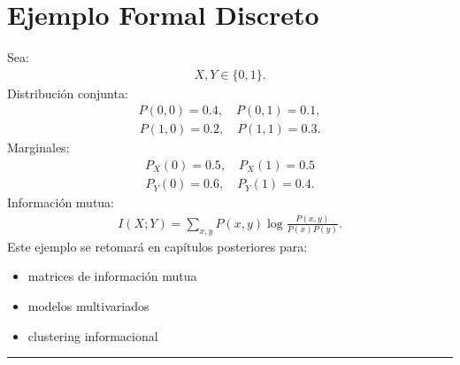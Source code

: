 \documentclass[letterpaper,10pt,english]{jupyterBook}
\begin{document}
\section{Ejemplo Formal Discreto}
\label{\detokenize{02_mathematical_foundations/formal_definitions:ejemplo-formal-discreto}}
\sphinxAtStartPar
Sea:
\begin{equation*}
\begin{split}
X,Y\in\{0,1\}.
\end{split}
\end{equation*}
\sphinxAtStartPar
Distribución conjunta:
\begin{equation*}
\begin{split}
P(0,0)=0.4,\quad
P(0,1)=0.1,
\end{split}
\end{equation*}\begin{equation*}
\begin{split}
P(1,0)=0.2,\quad
P(1,1)=0.3.
\end{split}
\end{equation*}
\sphinxAtStartPar
Marginales:
\begin{equation*}
\begin{split}
P_X(0)=0.5,\quad
P_X(1)=0.5
\end{split}
\end{equation*}\begin{equation*}
\begin{split}
P_Y(0)=0.6,\quad
P_Y(1)=0.4.
\end{split}
\end{equation*}
\sphinxAtStartPar
Información mutua:
\begin{equation*}
\begin{split}
I(X;Y)=\sum_{x,y}P(x,y)
\log\frac{P(x,y)}{P(x)P(y)}.
\end{split}
\end{equation*}
\sphinxAtStartPar
Este ejemplo se retomará en capítulos posteriores para:
\begin{itemize}
\item {} 
\sphinxAtStartPar
matrices de información mutua

\item {} 
\sphinxAtStartPar
modelos multivariados

\item {} 
\sphinxAtStartPar
clustering informacional

\end{itemize}


\bigskip\hrule\bigskip
\end{document}
